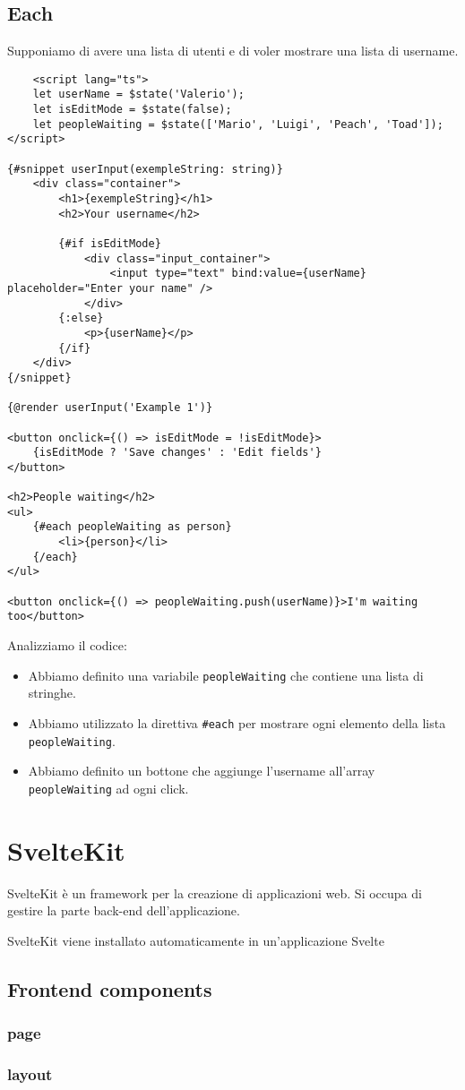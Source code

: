 \documentclass[12pt]{article}
\begin{document}
\subsection{Each}
Supponiamo di avere una lista di utenti e di voler mostrare
una lista di username.
\begin{verbatim}
    <script lang="ts">
    let userName = $state('Valerio');
    let isEditMode = $state(false);
    let peopleWaiting = $state(['Mario', 'Luigi', 'Peach', 'Toad']);
</script>

{#snippet userInput(exempleString: string)}
    <div class="container">
        <h1>{exempleString}</h1>
        <h2>Your username</h2>

        {#if isEditMode}
            <div class="input_container">
                <input type="text" bind:value={userName} placeholder="Enter your name" />
            </div>
        {:else}
            <p>{userName}</p>
        {/if}
    </div>
{/snippet}

{@render userInput('Example 1')}

<button onclick={() => isEditMode = !isEditMode}>
    {isEditMode ? 'Save changes' : 'Edit fields'}
</button>

<h2>People waiting</h2>
<ul>
    {#each peopleWaiting as person}
        <li>{person}</li>
    {/each}
</ul>

<button onclick={() => peopleWaiting.push(userName)}>I'm waiting too</button>
\end{verbatim}
Analizziamo il codice:
\begin{itemize}
    \item Abbiamo definito una variabile \texttt{peopleWaiting} che contiene
    una lista di stringhe.
    \item Abbiamo utilizzato la direttiva \texttt{\#each} per mostrare
    ogni elemento della lista \texttt{peopleWaiting}.
    \item Abbiamo definito un bottone che aggiunge l'username all'array
    \texttt{peopleWaiting} ad ogni click.
\end{itemize}



\pagebreak
\section{SvelteKit}
SvelteKit è un framework per la creazione di applicazioni web.
Si occupa di gestire la parte back-end
dell'applicazione.
\begin{highlight}
    SvelteKit viene installato automaticamente in un'applicazione
    Svelte
\end{highlight}

\subsection{Frontend components}
\subsubsection{page}
\subsubsection{layout}
\end{document}
